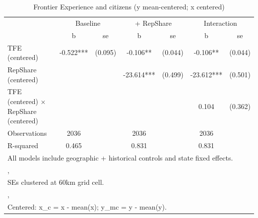 \begin{table}[htbp]\centering
\def\sym#1{\ifmmode^{#1}\else\(^{#1}\)\fi}
\caption{Frontier Experience and citizens (y mean-centered; x centered)}
\begin{tabular}{l*{3}{cc}}
\toprule
                &\multicolumn{2}{c}{Baseline}&\multicolumn{2}{c}{ + RepShare}&\multicolumn{2}{c}{Interaction}\\
                &        b   &       se&        b   &       se&        b   &       se\\
\midrule
TFE (centered)  &   -0.522***&  (0.095)&   -0.106** &  (0.044)&   -0.106** &  (0.044)\\
RepShare (centered)&            &         &  -23.614***&  (0.499)&  -23.612***&  (0.501)\\
TFE (centered) $\times$ RepShare (centered)&            &         &            &         &    0.104   &  (0.362)\\
\midrule
Observations    &     2036   &         &     2036   &         &     2036   &         \\
R-squared       &    0.465   &         &    0.831   &         &    0.831   &         \\
\bottomrule
\multicolumn{7}{l}{\footnotesize All models include geographic + historical controls and state fixed effects.}\\
\multicolumn{7}{l}{\footnotesize ,}\\
\multicolumn{7}{l}{\footnotesize SEs clustered at 60km grid cell.}\\
\multicolumn{7}{l}{\footnotesize ,}\\
\multicolumn{7}{l}{\footnotesize Centered: x\_c = x - mean(x); y\_mc = y - mean(y).}\\
\end{tabular}
\end{table}
